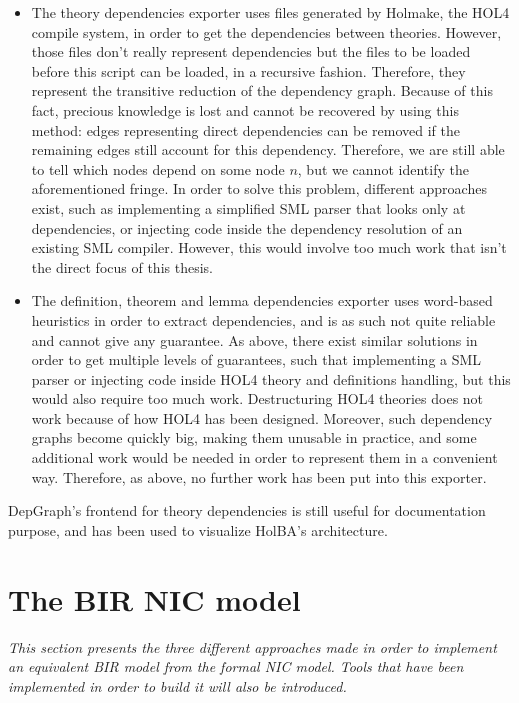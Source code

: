 \documentclass[10pt,a4paper]{article}
\begin{document}
\begin{multicols}{2}
\begin{itemize}
	\item The theory dependencies exporter uses files generated by Holmake, the HOL4 compile system, in order to get the dependencies between theories. However, those files don't really represent dependencies but the files to be loaded before this script can be loaded, in a recursive fashion. Therefore, they represent the transitive reduction of the dependency graph. Because of this fact, precious knowledge is lost and cannot be recovered by using this method: edges representing direct dependencies can be removed if the remaining edges still account for this dependency. Therefore, we are still able to tell which nodes depend on some node $n$, but we cannot identify the aforementioned fringe. In order to solve this problem, different approaches exist, such as implementing a simplified SML parser that looks only at dependencies, or injecting code inside the dependency resolution of an existing SML compiler. However, this would involve too much work that isn't the direct focus of this thesis.
	\item The definition, theorem and lemma dependencies exporter uses word-based heuristics in order to extract dependencies, and is as such not quite reliable and cannot give any guarantee. As above, there exist similar solutions in order to get multiple levels of guarantees, such that implementing a SML parser or injecting code inside HOL4 theory and definitions handling, but this would also require too much work. Destructuring HOL4 theories does not work because of how HOL4 has been designed. Moreover, such dependency graphs become quickly big, making them unusable in practice, and some additional work would be needed in order to represent them in a convenient way. Therefore, as above, no further work has been put into this exporter.
\end{itemize}

\noindent DepGraph's frontend for theory dependencies is still useful for documentation purpose, and has been used to visualize HolBA's architecture.


\section{The BIR NIC model} \label{nic-model}
\textit{This section presents the three different approaches made in order to implement an equivalent BIR model from the formal NIC model. Tools that have been implemented in order to build it will also be introduced.}
\medskip


\end{multicols}
\end{document}
